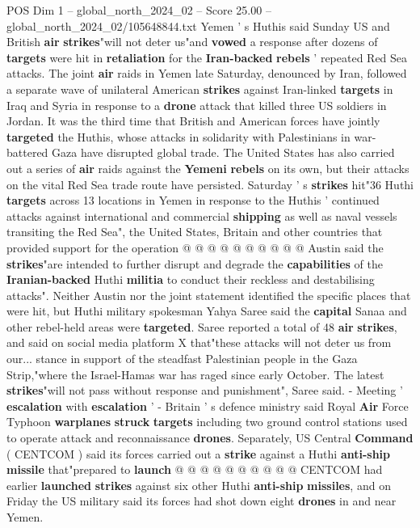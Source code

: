 \begin{textsample}{POS Dim 1 – global\_north\_2024\_02 – Score 25.00 – global\_north\_2024\_02/105648844.txt}  \label{ex:f1_pos_275}
Yemen ' s Huthis said Sunday US and British \textbf{air} \textbf{strikes}"will not deter us"and \textbf{vowed} a response after dozens of \textbf{targets} were hit in \textbf{retaliation} for the \textbf{Iran-backed} \textbf{rebels} ' repeated Red Sea attacks.
The joint \textbf{air} raids in Yemen late Saturday, denounced by Iran, followed a separate wave of unilateral American \textbf{strikes} against Iran-linked \textbf{targets} in Iraq and Syria in response to a \textbf{drone} attack that killed three US soldiers in Jordan.
It was the third time that British and American forces have jointly \textbf{targeted} the Huthis, whose attacks in solidarity with Palestinians in war-battered Gaza have disrupted global trade.
The United States has also carried out a series of \textbf{air} raids against the \textbf{Yemeni} \textbf{rebels} on its own, but their attacks on the vital Red Sea trade route have persisted.
Saturday ' s \textbf{strikes} hit"36 Huthi \textbf{targets} across 13 locations in Yemen in response to the Huthis ' continued attacks against international and commercial \textbf{shipping} as well as naval vessels transiting the Red Sea", the United States, Britain and other countries that provided support for the operation @ @ @ @ @ @ @ @ @ @ Austin said the \textbf{strikes}"are intended to further disrupt and degrade the \textbf{capabilities} of the \textbf{Iranian-backed} Huthi \textbf{militia} to conduct their reckless and destabilising attacks".
Neither Austin nor the joint statement identified the specific places that were hit, but Huthi military spokesman Yahya Saree said the \textbf{capital} Sanaa and other rebel-held areas were \textbf{targeted}.
Saree reported a total of 48 \textbf{air} \textbf{strikes}, and said on social media platform X that"these attacks will not deter us from our... stance in support of the steadfast Palestinian people in the Gaza Strip,"where the Israel-Hamas war has raged since early October.
The latest \textbf{strikes}"will not pass without response and punishment", Saree said. - Meeting ' \textbf{escalation} with \textbf{escalation} ' - Britain ' s defence ministry said Royal \textbf{Air} Force Typhoon \textbf{warplanes} \textbf{struck} \textbf{targets} including two ground control stations used to operate attack and reconnaissance \textbf{drones}.
Separately, US Central \textbf{Command} ( CENTCOM ) said its forces carried out a \textbf{strike} against a Huthi \textbf{anti-ship} \textbf{missile} that"prepared to \textbf{launch} @ @ @ @ @ @ @ @ @ @ CENTCOM had earlier \textbf{launched} \textbf{strikes} against six other Huthi \textbf{anti-ship} \textbf{missiles}, and on Friday the US military said its forces had shot down eight \textbf{drones} in and near Yemen.

\end{textsample}
